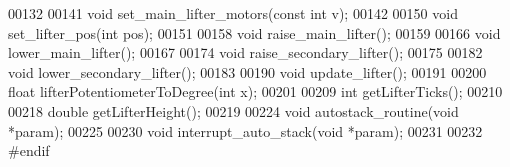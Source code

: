 \begin{DoxyCode}
00132 
00141 \textcolor{keywordtype}{void} set_main_lifter_motors(\textcolor{keyword}{const} \textcolor{keywordtype}{int} v);
00142 
00150 \textcolor{keywordtype}{void} set_lifter_pos(\textcolor{keywordtype}{int} pos);
00151 
00158 \textcolor{keywordtype}{void} raise_main_lifter();
00159 
00166 \textcolor{keywordtype}{void} lower_main_lifter();
00167 
00174 \textcolor{keywordtype}{void} raise_secondary_lifter();
00175 
00182 \textcolor{keywordtype}{void} lower_secondary_lifter();
00183 
00190 \textcolor{keywordtype}{void} update_lifter();
00191 
00200 \textcolor{keywordtype}{float} lifterPotentiometerToDegree(\textcolor{keywordtype}{int} x);
00201 
00209 \textcolor{keywordtype}{int} getLifterTicks();
00210 
00218 \textcolor{keywordtype}{double} getLifterHeight();
00219 
00224 \textcolor{keywordtype}{void} autostack_routine(\textcolor{keywordtype}{void} *param);
00225 
00230 \textcolor{keywordtype}{void} interrupt_auto_stack(\textcolor{keywordtype}{void} *param);
00231 
00232 \textcolor{preprocessor}{#endif}
\end{DoxyCode}
